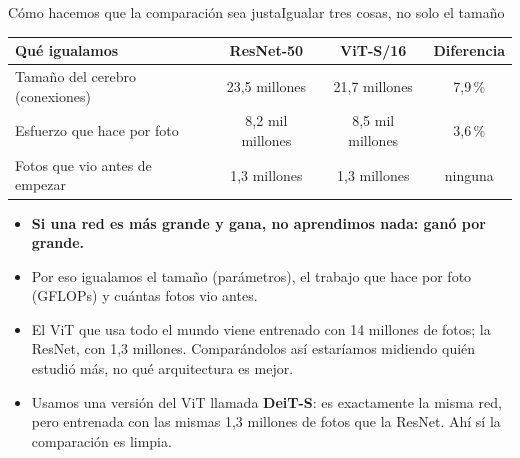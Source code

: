 \documentclass[aspectratio=169,11pt,table]{beamer}
\begin{document}
\begin{frame}{Cómo hacemos que la comparación sea justa}{Igualar tres cosas, no solo el tamaño}
{\scriptsize
\centering
\begin{tabular}{lccc}
\toprule
\rowcolor{verdeosc}\color{white}\bfseries Qué igualamos & \color{white}\bfseries ResNet-50 & \color{white}\bfseries ViT-S/16 & \color{white}\bfseries Diferencia \\
\midrule
Tamaño del \guillemotleft{}cerebro\guillemotright{} (conexiones) & 23{,}5 millones & 21{,}7 millones & 7{,}9\,\% \\
Esfuerzo que hace por foto & 8{,}2 mil millones & 8{,}5 mil millones & 3{,}6\,\% \\
Fotos que vio antes de empezar & 1,3 millones & 1,3 millones & ninguna \\
\bottomrule
\end{tabular}
}
\vspace{0.5em}
{\scriptsize
\setlength{\itemsep}{0.25em}
\begin{itemize}
  \item {\bfseries Si una red es más grande y gana, no aprendimos nada: ganó por grande.}
  \item Por eso igualamos el tamaño (parámetros), el trabajo que hace por foto (GFLOPs) y cuántas fotos vio antes.
  \item El ViT que usa todo el mundo viene entrenado con 14 millones de fotos; la ResNet, con 1,3 millones. Comparándolos así estaríamos midiendo quién estudió más, no qué arquitectura es mejor.
  \item Usamos una versión del ViT llamada \textbf{DeiT-S}: es exactamente la misma red, pero entrenada con las mismas 1,3 millones de fotos que la ResNet. Ahí sí la comparación es limpia.
\end{itemize}
}
\end{frame}
\end{document}
